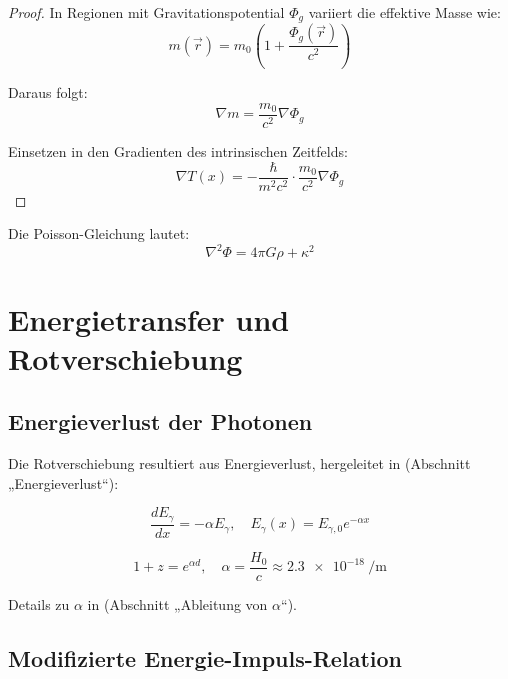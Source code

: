 \documentclass[a4paper,12pt]{article}
\theoremstyle{definition}
\theoremstyle{remark}
\newcommand{\Tfield}{T(x)} %
\begin{document}
\begin{proof}
	In Regionen mit Gravitationspotential \(\Phi_g\) variiert die effektive Masse wie:
	\begin{equation}
		m(\vec{r}) = m_0 \left(1 + \frac{\Phi_g(\vec{r})}{c^2}\right)
	\end{equation}
	
	Daraus folgt:
	\begin{equation}
		\nabla m = \frac{m_0}{c^2} \nabla \Phi_g
	\end{equation}
	
	Einsetzen in den Gradienten des intrinsischen Zeitfelds:
	\begin{equation}
		\nabla \Tfield = -\frac{\hbar}{m^2 c^2} \cdot \frac{m_0}{c^2} \nabla \Phi_g
	\end{equation}
\end{proof}

Die Poisson-Gleichung lautet:
\begin{equation}
	\nabla^2 \Phi = 4\pi G \rho + \kappa^2
\end{equation}

\section{Energietransfer und Rotverschiebung}

\subsection{Energieverlust der Photonen}

Die Rotverschiebung resultiert aus Energieverlust, hergeleitet in \cite{pascher_messdifferenzen_2025} (Abschnitt „Energieverlust“):

\begin{equation}
	\frac{d E_{\gamma}}{d x} = -\alpha E_{\gamma}, \quad E_{\gamma}(x) = E_{\gamma,0} e^{-\alpha x}
\end{equation}

\begin{equation}
	1 + z = e^{\alpha d}, \quad \alpha = \frac{H_0}{c} \approx \SI{2.3e-18}{\per\meter}
\end{equation}

Details zu \(\alpha\) in \cite{pascher_params_2025} (Abschnitt „Ableitung von \(\alpha\)“).

\subsection{Modifizierte Energie-Impuls-Relation}
\end{document}
